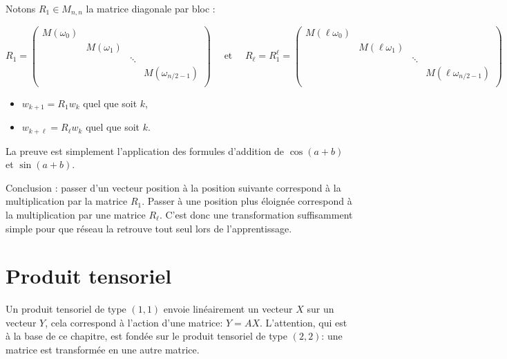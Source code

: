 \documentclass[11pt,class=report,crop=false]{standalone}
\begin{document}


Notons $R_1 \in M_{n,n}$ la matrice diagonale par bloc :

\[
R_1 = 
\begin{pmatrix}
	M(\omega_0) & && \\ 
	& M(\omega_1) & &  \\
	& & \ddots &  \\
	& & & M(\omega_{n/2-1}) \\ 			
\end{pmatrix}
\quad \text{ et } \quad
R_\ell = R_1^\ell = 
\begin{pmatrix}
	M(\ell\omega_0) & && \\ 
	& M(\ell\omega_1) & &  \\
	& & \ddots &  \\
	& & & M(\ell\omega_{n/2-1}) \\ 			
\end{pmatrix}
\]

\begin{proposition}
\sauteligne
\begin{itemize}	
  \item $w_{k+1} = R_1 w_k$	quel que soit $k$,
  \item $w_{k+\ell} = R_\ell w_k$ quel que soit $k$.
\end{itemize}
\end{proposition}

La preuve est simplement l'application des formules d'addition de $\cos(a+b)$ et $\sin(a+b)$.

Conclusion : passer d'un vecteur position à la position suivante correspond à la multiplication par la matrice $R_1$. Passer à une position plus éloignée correspond à la multiplication par une matrice $R_\ell$. C'est donc une transformation suffisamment simple pour que réseau la retrouve tout seul lors de l'apprentissage.


\section{Produit tensoriel}

Un produit tensoriel de type $(1,1)$ envoie linéairement un vecteur $X$ sur un vecteur $Y$, cela correspond à l'action d'une matrice: $Y = AX$.
L'attention, qui est à la base de ce chapitre, est fondée sur le produit tensoriel de type $(2,2)$: une matrice est transformée en une autre matrice.
\end{document}
